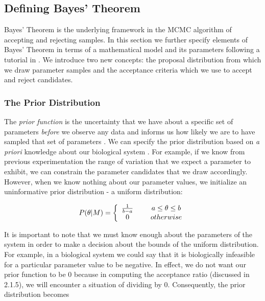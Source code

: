 \documentclass{article}
\begin{document}
\subsection{Defining Bayes' Theorem} 
Bayes' Theorem is the underlying framework in the MCMC algorithm of accepting and rejecting samples. In this section we further specify elements of Bayes' Theorem in terms of a mathematical model and its parameters following a tutorial in \cite{astrostats}. We introduce two new concepts: the proposal distribution from which we draw parameter samples and the acceptance criteria which we use to accept and reject candidates.
\subsubsection{The Prior Distribution} The \emph{prior function} is the uncertainty that we have about a specific set of parameters \emph{before} we observe any data and informs us how likely we are to have sampled that set of parameters \cite{astrostats}. We can specify the prior distribution based on \textit{a priori} knowledge about our biological system \cite{bayesprior}. For example, if we know from previous experimentation the range of variation that we expect a parameter to exhibit, we can constrain the parameter candidates that we draw accordingly. However, when we know nothing about our parameter values, we initialize an uninformative prior distribution - a uniform distribution:
\begin{center} \label{eq:3mcmc}
\begin{align}
  P(\theta|M) = \left\{ \begin{array}{cc} 
                \frac{1}{b-a} & \hspace{5mm} a \leq \theta \leq b \\
                0 & \hspace{5mm} otherwise \\
                \end{array} \right.
\end{align}
\end{center}
It is important to note that we must know enough about the parameters of the system in order to make a decision about the bounds of the uniform distribution. For example, in a biological system we could say that it is biologically infeasible for a particular parameter value to be negative. In effect, we do not want our prior function to be 0 because in computing the acceptance ratio (discussed in 2.1.5), we will encounter a situation of dividing by 0. Consequently, the prior distribution becomes
\end{document}
